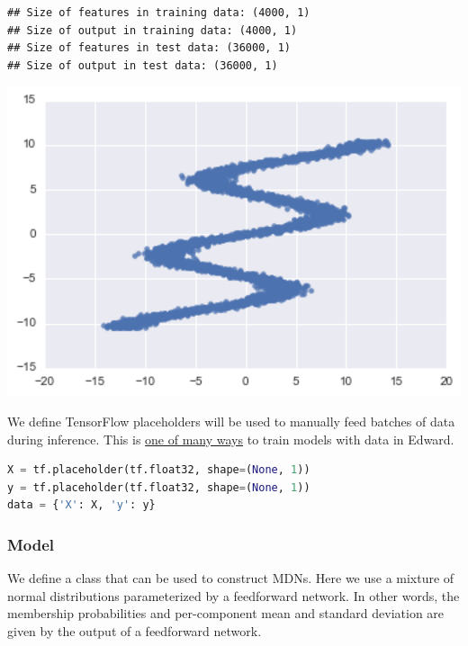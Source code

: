 \begin{lstlisting}
## Size of features in training data: (4000, 1)
## Size of output in training data: (4000, 1)
## Size of features in test data: (36000, 1)
## Size of output in test data: (36000, 1)
\end{lstlisting}
\includegraphics[width=700px]{images/mdn-fig0.png}

We define TensorFlow placeholders will be used to manually feed batches of data during inference. This is \href{http://edwardlib.org/api/data}{one of many ways} to train models with data in Edward.

\begin{lstlisting}[language=Python]
X = tf.placeholder(tf.float32, shape=(None, 1))
y = tf.placeholder(tf.float32, shape=(None, 1))
data = {'X': X, 'y': y}
\end{lstlisting}


\subsubsection{Model}

We define a class that can be used to construct MDNs. Here we use a
mixture of normal distributions parameterized by a feedforward
network. In other words, the membership probabilities and
per-component mean and standard deviation are given by the output of a
feedforward network.

